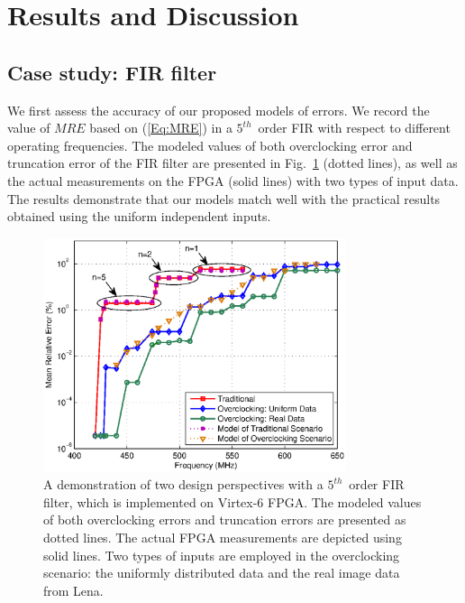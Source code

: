 \documentclass[prodmode,acmtrets]{acmsmall} %
\begin{document}
\section{Results and Discussion}\label{Section_Experiments}
\subsection{Case study: FIR filter}
We first assess the accuracy of our proposed models of errors. We record the value of $MRE$ based on (\ref{Eq:MRE}) in a $5^{th}$~order FIR with respect to different operating frequencies. The modeled values of both overclocking error and truncation error of the FIR filter are presented in Fig.~\ref{Fig:FIR} (dotted lines), as well as the actual measurements on the FPGA (solid lines) with two types of input data. The results demonstrate that our models match well with the practical results obtained using the uniform independent inputs.
\begin{figure}[tbp]
  \centering
  \vspace{-3ex}
  \includegraphics[width=3.5in]{./Figures/Exp/FIR/FIR_Compare_color.eps}
  \vspace{-2ex}
  \caption{A demonstration of two design perspectives with a $5^{th}$~order FIR filter, which is implemented on Virtex-6 FPGA. The modeled values of both overclocking errors and truncation errors are presented as dotted lines. The actual FPGA measurements are depicted using solid lines. Two types of inputs are employed in the overclocking scenario: the uniformly distributed data and the real image data from Lena.}
  \label{Fig:FIR}
\end{figure}
\end{document}
